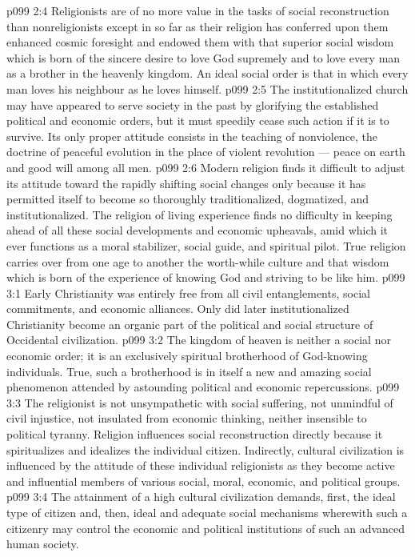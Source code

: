 \vs p099 2:4 Religionists are of no more value in the tasks of social reconstruction than nonreligionists except in so far as their religion has conferred upon them enhanced cosmic foresight and endowed them with that superior social wisdom which is born of the sincere desire to love God supremely and to love every man as a brother in the heavenly kingdom. An ideal social order is that in which every man loves his neighbour as he loves himself.
\vs p099 2:5 \pc The institutionalized church may have appeared to serve society in the past by glorifying the established political and economic orders, but it must speedily cease such action if it is to survive. Its only proper attitude consists in the teaching of nonviolence, the doctrine of peaceful evolution in the place of violent revolution --- peace on earth and good will among all men.
\vs p099 2:6 Modern religion finds it difficult to adjust its attitude toward the rapidly shifting social changes only because it has permitted itself to become so thoroughly traditionalized, dogmatized, and institutionalized. The religion of living experience finds no difficulty in keeping ahead of all these social developments and economic upheavals, amid which it ever functions as a moral stabilizer, social guide, and spiritual pilot. True religion carries over from one age to another the worth\hyp{}while culture and that wisdom which is born of the experience of knowing God and striving to be like him.
\vs p099 3:1 Early Christianity was entirely free from all civil entanglements, social commitments, and economic alliances. Only did later institutionalized Christianity become an organic part of the political and social structure of Occidental civilization.
\vs p099 3:2 \pc The kingdom of heaven is neither a social nor economic order; it is an exclusively spiritual brotherhood of God\hyp{}knowing individuals. True, such a brotherhood is in itself a new and amazing social phenomenon attended by astounding political and economic repercussions.
\vs p099 3:3 The religionist is not unsympathetic with social suffering, not unmindful of civil injustice, not insulated from economic thinking, neither insensible to political tyranny. Religion influences social reconstruction directly because it spiritualizes and idealizes the individual citizen. Indirectly, cultural civilization is influenced by the attitude of these individual religionists as they become active and influential members of various social, moral, economic, and political groups.
\vs p099 3:4 \pc The attainment of a high cultural civilization demands, first, the ideal type of citizen and, then, ideal and adequate social mechanisms wherewith such a citizenry may control the economic and political institutions of such an advanced human society.
